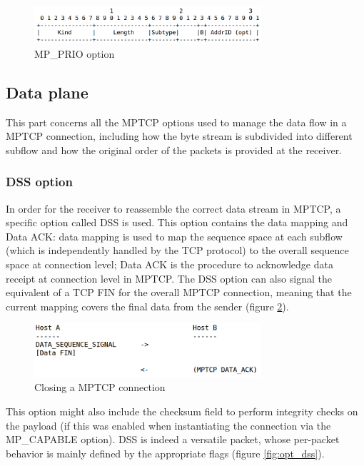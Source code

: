 \begin{figure}[!htb]
\centering
\includegraphics[width=0.75\textwidth]{images/opt_prio}
\caption{MP\_PRIO option}
\label{fig:opt_prio}
\end{figure}

\subsection{Data plane}
This part concerns all the MPTCP options used to manage the data flow in a MPTCP connection, including how the byte stream is subdivided into different subflow and how the original order of the packets is provided at the receiver.

\subsubsection{DSS option}
In order for the receiver to reassemble the correct data stream in MPTCP, a specific option called DSS is used. This option contains the data mapping and Data ACK: data mapping is used to map the sequence space at each subflow (which is independently handled by the TCP protocol) to the overall sequence space at connection level; Data ACK is the procedure to acknowledge data receipt at connection level in MPTCP.
The DSS option can also signal the equivalent of a TCP FIN for the overall MPTCP connection, meaning that the current mapping covers the final data from the sender (figure \ref{fig:mptcp_fin}). 

\begin{figure}[!htb]
\centering
\includegraphics[width=0.75\textwidth]{images/mptcp_fin}
\caption{Closing a MPTCP connection}
\label{fig:mptcp_fin}
\end{figure}

This option might also include the checksum field to perform integrity checks on the payload (if this was enabled when instantiating the connection via the MP\_CAPABLE option).
DSS is indeed a versatile packet, whose per-packet behavior is mainly defined by the appropriate flags (figure \ref{fig:opt_dss}). 

